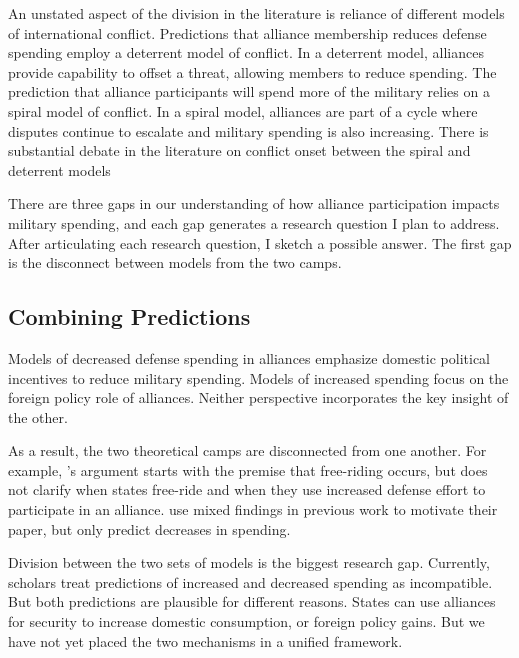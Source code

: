 \documentclass[12pt]{article}
\begin{document}
An unstated aspect of the division in the literature is reliance of different models of international conflict. 
Predictions that alliance membership reduces defense spending employ a deterrent model of conflict. 
In a deterrent model, alliances provide capability to offset a threat, allowing members to reduce spending.
The prediction that alliance participants will spend more of the military relies on a spiral model of conflict.
In a spiral model, alliances are part of a cycle where disputes continue to escalate and military spending is also increasing. 
There is substantial debate in the literature on conflict onset between the spiral and deterrent models \cite{Jervis1978, Reiter1995, SeneseVasquez2008, JacksonMorelli2008, JohnsonLeeds2011, Kenwicketal2015}


There are three gaps in our understanding of how alliance participation impacts military spending, and each gap generates a research question I plan to address. 
After articulating each research question, I sketch a possible answer. 
The first gap is the disconnect between models from the two camps. 



\subsection{Combining Predictions} %


Models of decreased defense spending in alliances emphasize domestic political incentives to reduce military spending. 
Models of increased spending focus on the foreign policy role of alliances. 
Neither perspective incorporates the key insight of the other.


As a result, the two theoretical camps are disconnected from one another. 
For example, \citet{Horowitzetal2017}'s argument starts with the premise that free-riding occurs, but does not clarify when states free-ride and when they use increased defense effort to participate in an alliance. 
\citet{DigiuseppePoast2016} use mixed findings in previous work to motivate their paper, but only predict decreases in spending. 


Division between the two sets of models is the biggest research gap. 
Currently, scholars treat predictions of increased and decreased spending as incompatible. 
But both predictions are plausible for different reasons. 
States can use alliances for security to increase domestic consumption, or foreign policy gains. 
But we have not yet placed the two mechanisms in a unified framework. 
\end{document}
